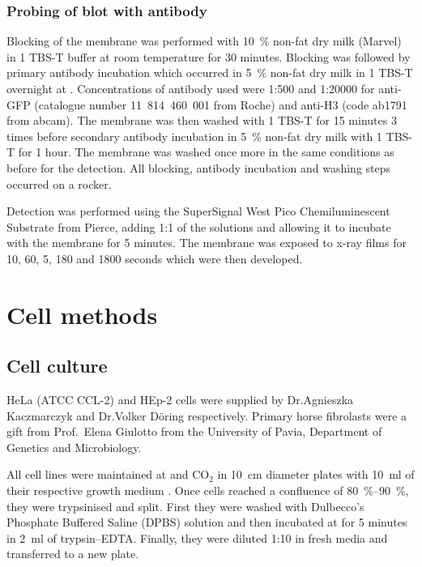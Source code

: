       \subsubsection{Probing of blot with antibody}
        Blocking of the membrane was performed with \SI{10}{\percent}
        non-fat dry milk (Marvel) in \SI{1}{\X} TBS-T buffer
        at room temperature for 30 minutes. Blocking was followed by
        primary antibody incubation which occurred in \SI{5}{\percent} non-fat
        dry milk in \SI{1}{\X} TBS-T overnight at . Concentrations of
        antibody used were 1:500 and 1:20000 for anti-GFP (catalogue
        number 11~814~460~001 from Roche) and anti-H3 (code ab1791 from
        abcam). The membrane was then washed with \SI{1}{\X} TBS-T for
        15 minutes 3 times before secondary antibody incubation
        in \SI{5}{\percent} non-fat dry milk with \SI{1}{\X} TBS-T for
        1 hour. The membrane was washed once more in the same
        conditions as before for the detection. All blocking, antibody
        incubation and washing steps occurred on a rocker.

        Detection was performed using the SuperSignal West Pico Chemiluminescent
        Substrate from Pierce, adding 1:1 of the solutions and allowing it to incubate
        with the membrane for 5 minutes. The membrane was exposed to x-ray films for
        10, 60, 5, 180 and 1800 seconds which were then developed.


  \section{Cell methods}
    \subsection{Cell culture}
      HeLa (ATCC CCL-2) and HEp-2 cells were supplied by
      Dr.\@ Agnieszka Kaczmarczyk \citep{AgaThesis}
      and Dr.\@ Volker Döring \citep{VolkerThesis} respectively.
      Primary horse fibrolasts were a gift from Prof.~Elena Giulotto from the
      University of Pavia, Department of Genetics and Microbiology.

      All cell lines were maintained at 
      and  CO$_2$ in \SI{10}{\cm}
      diameter plates with \SI{10}{\ml} of their respective growth
      medium .
      Once cells reached a confluence of \SIrange{80}{90}{\percent},
      they were trypsinised and split.  First they were washed with
      Dulbecco's Phosphate Buffered Saline (DPBS) solution and then
      incubated at  for 5 minutes in \SI{2}{\ml} of
      trypsin--EDTA.  Finally, they were diluted 1:10 in fresh media
      and transferred to a new plate.


